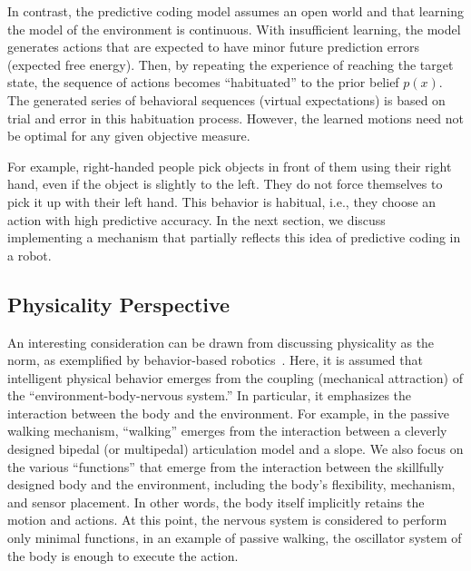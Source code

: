 In contrast, the predictive coding model assumes an open world and that learning the model of the environment is continuous.
With insufficient learning, the model generates actions that are expected to have minor future prediction errors (expected free energy).
Then, by repeating the experience of reaching the target state, the sequence of actions becomes ``habituated'' to the prior belief $p(x)$.
The generated series of behavioral sequences (virtual expectations) is based on trial and error in this habituation process.
However, the learned motions need not be optimal for any given objective measure.

For example, right-handed people pick objects in front of them using their right hand, even if the object is slightly to the left.
They do not force themselves to pick it up with their left hand. This behavior is habitual, i.e., they choose an action with high predictive accuracy.
In the next section, we discuss implementing a mechanism that partially reflects this idea of predictive coding in a robot.


\subsection{Physicality Perspective}
An interesting consideration can be drawn from discussing physicality as the norm, as exemplified by behavior-based robotics~\cite{brooks1991intelligence}.
Here, it is assumed that intelligent physical behavior emerges from the coupling (mechanical attraction) of the ``environment-body-nervous system.''
In particular, it emphasizes the interaction between the body and the environment.
For example, in the passive walking mechanism, ``walking'' emerges from the interaction between a cleverly designed bipedal (or multipedal) articulation model and a slope.
We also focus on the various ``functions'' that emerge from the interaction between the skillfully designed body and the environment, including the body's flexibility, mechanism, and sensor placement.
In other words, the body itself implicitly retains the motion and actions.
At this point, the nervous system is considered to perform only minimal functions, in an example of passive walking, the oscillator system of the body is enough to execute the action.


